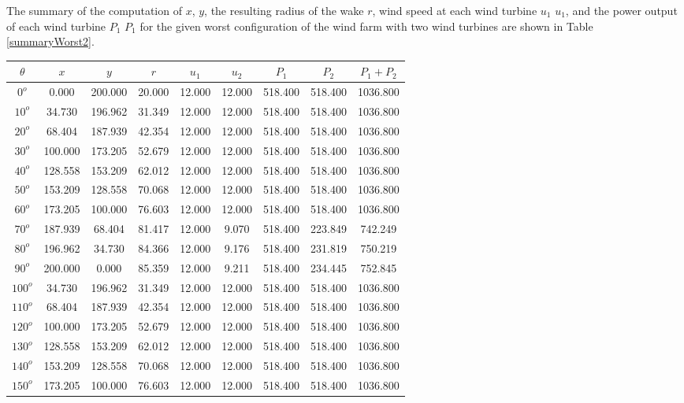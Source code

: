         The summary of the computation of $x$, $y$, the resulting radius of the wake $r$, wind speed at each wind turbine $u_1$ $u_1$, and the power output of each wind turbine $P_1$ $P_1$ for the given worst configuration of the wind farm with two wind turbines are shown in Table \ref{summaryWorst2}.
        
        \singlespacing
    \begin{table}[H]
        \centering
        \begin{tabular}{|c|c|c|c|c|c|c|c|c|} \hline
    $\theta$ &$x$ &$y$ &$r$ &$u_1$ &$u_2$ &$P_1$ &$P_2$ &$P_1+P_2$ \\ \hline
$0^o$	&0.000	&200.000	&20.000	&12.000	&12.000	&518.400	&518.400	&1036.800 \\ \hline
$10^o$	&34.730	&196.962	&31.349	&12.000	&12.000	&518.400	&518.400	&1036.800 \\ \hline
$20^o$	&68.404	&187.939	&42.354	&12.000	&12.000	&518.400	&518.400	&1036.800 \\ \hline
$30^o$	&100.000	&173.205	&52.679	&12.000	&12.000	&518.400	&518.400	&1036.800 \\ \hline
$40^o$	&128.558	&153.209	&62.012	&12.000	&12.000	&518.400	&518.400	&1036.800 \\ \hline
$50^o$	&153.209	&128.558	&70.068	&12.000	&12.000	&518.400	&518.400	&1036.800 \\ \hline
$60^o$	&173.205	&100.000	&76.603	&12.000	&12.000	&518.400	&518.400	&1036.800 \\ \hline
$70^o$	&187.939	&68.404	&81.417	&12.000	&9.070	&518.400	&223.849	&742.249 \\ \hline
$80^o$	&196.962	&34.730	&84.366	&12.000	&9.176	&518.400	&231.819	&750.219 \\ \hline
$90^o$	&200.000	&0.000	&85.359	&12.000	&9.211	&518.400	&234.445	&752.845 \\ \hline
$100^o$	&34.730	&196.962	&31.349	&12.000	&12.000	&518.400	&518.400	&1036.800 \\ \hline
$110^o$	&68.404	&187.939	&42.354	&12.000	&12.000	&518.400	&518.400	&1036.800 \\ \hline
$120^o$	&100.000	&173.205	&52.679	&12.000	&12.000	&518.400	&518.400	&1036.800 \\ \hline
$130^o$	&128.558	&153.209	&62.012	&12.000	&12.000	&518.400	&518.400	&1036.800 \\ \hline
$140^o$	&153.209	&128.558	&70.068	&12.000	&12.000	&518.400	&518.400	&1036.800 \\ \hline
$150^o$	&173.205	&100.000	&76.603	&12.000	&12.000	&518.400	&518.400	&1036.800 \\ \hline

\end{tabular}
\end{table}
